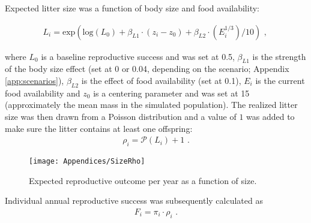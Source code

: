 Expected litter size was a function of body size and food availability:

\begin{align}
L_i = \mathrm{exp}(\mathrm{log}(L_{0}) + \beta_{L1} \cdot (z_i-z_0) + \beta_{L2} \cdot (E_i^{1/3}) / 10) \text{ , }
\end{align}

where $L_{0}$ is a baseline reproductive success and was set at 0.5, $\beta_{L1}$ is the strength of the body size effect (set at 0 or 0.04, depending on the scenario; Appendix \ref{app:scenarios}), $\beta_{L2}$ is the effect of food availability (set at 0.1), $E_i$ is the current food availability and $z_0$ is a centering parameter and was set at 15 (approximately the mean mass in the simulated population).
The realized litter size was then drawn from a Poisson distribution and a value of $1$ was added to make sure the litter contains at least one offspring:
\begin{align}
\rho_i = \mathcal{P}(L_i) + 1 \text{ .}
\end{align}
\begin{figure}[ht]
	\texttt{[image: Appendices/SizeRho]}
  \caption{Expected reproductive outcome per year as a function of size.}
   \label{SizeRho}
\end{figure}

Individual annual reproductive success was subsequently calculated as
\begin{align}
F_i = \pi_i \cdot \rho_i \text{ .}
\end{align}

